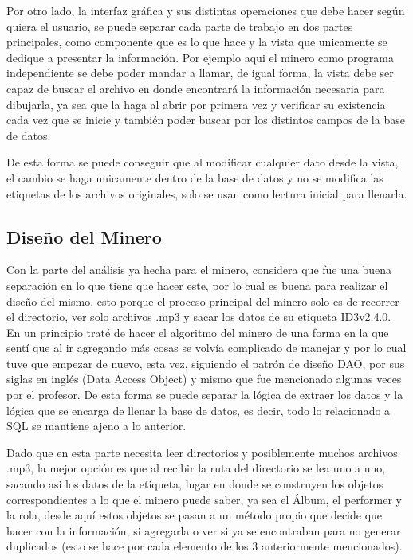 \documentclass[12pt,letterpaper]{article}
\begin{document}
Por otro lado, la interfaz gráfica y sus distintas operaciones que debe hacer según quiera el usuario, se puede separar cada parte de trabajo en dos partes principales, como componente que es lo que hace y la vista que unicamente se dedique a presentar la información. Por ejemplo aqui el minero como programa independiente se debe poder mandar a llamar, de igual forma, la vista debe ser capaz de buscar el archivo en donde encontrará la información necesaria para dibujarla, ya sea que la haga al abrir por primera vez y verificar su existencia cada vez que se inicie y también poder buscar por los distintos campos de la base de datos.

De esta forma se puede conseguir que al modificar cualquier dato desde la vista, el cambio se haga unicamente dentro de la base de datos y no se modifica las etiquetas de los archivos originales, solo se usan como lectura inicial para llenarla.



\newpage
\subsection*{Diseño del Minero}
Con la parte del análisis ya hecha para el minero, considera que fue una buena separación en lo que tiene que hacer este, por lo cual es buena para realizar el diseño del mismo, esto porque el proceso principal del minero solo es de recorrer el directorio, ver solo archivos .mp3 y sacar los datos de su etiqueta ID3v2.4.0. En un principio traté de hacer el algoritmo del minero de una forma en la que sentí que al ir agregando más cosas se volvía complicado de manejar y por lo cual tuve que empezar de nuevo, esta vez, siguiendo el patrón de diseño DAO, por sus siglas en inglés (Data Access Object) y mismo que fue mencionado algunas veces por el profesor. De esta forma se puede separar la lógica de extraer los datos y la lógica que se encarga de llenar la base de datos, es decir, todo lo relacionado a SQL se mantiene ajeno a lo anterior.

Dado que en esta parte necesita leer directorios y posiblemente muchos archivos .mp3, la mejor opción es que al recibir la ruta del directorio se lea uno a uno, sacando asi los datos de la etiqueta, lugar en donde se construyen los objetos correspondientes a lo que el minero puede saber, ya sea el Álbum, el performer y la rola, desde aquí estos objetos se pasan a un método propio que decide que hacer con la información, si agregarla o ver si ya se encontraban para no generar duplicados (esto se hace por cada elemento de los 3 anteriormente mencionados).
\end{document}
